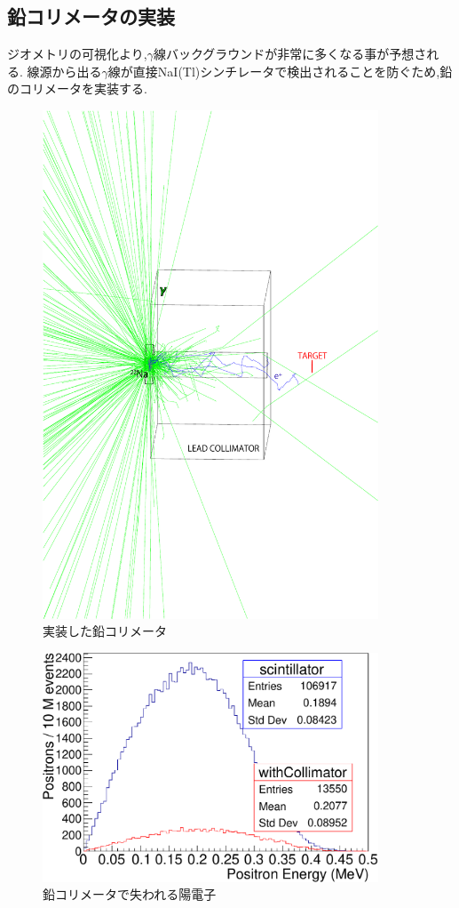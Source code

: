 \subsection{鉛コリメータの実装}
ジオメトリの可視化より,$\gamma$線バックグラウンドが非常に多くなる事が予想される.
線源から出る$\gamma$線が直接NaI(Tl)シンチレータで検出されることを防ぐため,鉛のコリメータを実装する.

\begin{figure}[htbp]
	\centering
		\includegraphics[width=10cm]{img/test1b_geometry.pdf}
	\caption{実装した鉛コリメータ}
	\label{test1b_geometry}
\end{figure}

\begin{figure}[htbp]
	\centering
		\includegraphics[width=10cm]{fig/collimator_loss.pdf}
	\caption{鉛コリメータで失われる陽電子}
	\label{collimator_loss}
\end{figure}


